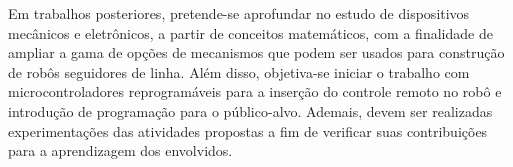 \documentclass{textolivre}
\begin{document}
Em trabalhos posteriores, pretende-se aprofundar no estudo de dispositivos
mecânicos e eletrônicos, a partir de conceitos matemáticos, com a finalidade de
ampliar a gama de opções de mecanismos que podem ser usados para construção de
robôs seguidores de linha. Além disso, objetiva-se iniciar o trabalho com
microcontroladores reprogramáveis para a inserção do controle remoto no robô e
introdução de programação para o público-alvo. Ademais, devem ser realizadas
experimentações das atividades propostas a fim de verificar suas contribuições
para a aprendizagem dos envolvidos.


\printbibliography\label{sec-bib}
\end{document}
